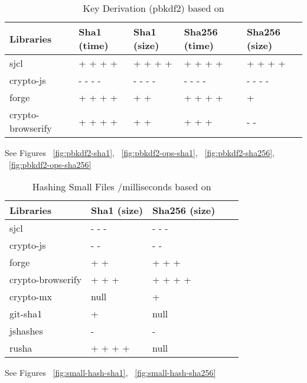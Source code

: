 \begin{table}[!h]
\centering
\caption{Key Derivation (pbkdf2) based on \cite {Tarr2014PerformanceLibraries.}}
\label{key-derivation-pbkdf2}
\begin{adjustbox}{center, width=\columnwidth-20pt}
\begin{tabular}{|l|l|l|l|l|}
\hline
Libraries & Sha1 (time) & Sha1 (size) & Sha256 (time) & Sha256 (size)	\\ \hline
sjcl				& + + + +	& + + + +	& + + + + 	& + + + +		\\ \hline
crypto-js			& - - - -	& - - - -	& - - - -	& - - - -		\\ \hline
forge				& + + + +	& + +		& + + + +	& +				\\ \hline
crypto-browserify	& + + + +	& + +		& + + +		& - -			\\ \hline
\end{tabular}
\end{adjustbox}
See Figures ~\ref{fig:pbkdf2-sha1}, ~\ref{fig:pbkdf2-ops-sha1}, ~\ref{fig:pbkdf2-sha256}, ~\ref{fig:pbkdf2-ops-sha256}
\end{table}

\begin{table}[!h]
\centering
\caption{Hashing Small Files /milliseconds based on \cite {Tarr2014PerformanceLibraries.}}
\label{hashing-small-files}
\begin{adjustbox}{center, width=\columnwidth-20pt}
\begin{tabular}{|l|l|l|l|l|}
\hline
Libraries & Sha1 (size) & Sha256 (size) \\ \hline
sjcl				& - - -	& - - -		\\ \hline
crypto-js			& - -	& - -		\\ \hline
forge				& + +	& + + +		\\ \hline
crypto-browserify	& + + +	& + + + +	\\ \hline
crypto-mx           & null	& +			\\ \hline
git-sha1            & +		& null		\\ \hline
jshashes            & -		& -			\\ \hline
rusha               & + + + +	& null	\\ \hline
\end{tabular}
\end{adjustbox}
See Figures ~\ref{fig:small-hash-sha1}, ~\ref{fig:small-hash-sha256}
\end{table}

